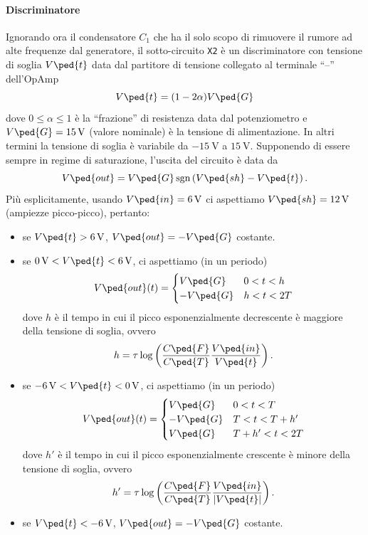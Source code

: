 \documentclass[10pt,a4paper]{article}
\begin{document}
\paragraph{Discriminatore}
Ignorando ora il condensatore $ C_{1} $ che ha il solo scopo di rimuovere il 
rumore ad alte frequenze dal generatore, il sotto-circuito \texttt{X2} è un 
discriminatore con tensione di soglia $ V\ped{t} $ data dal partitore di 
tensione collegato al terminale ``--'' dell'OpAmp
\[
  V\ped{t} = (1 - 2\alpha) V\ped{G}
\]
dove $ 0\leq \alpha \leq 1 $ è la ``frazione'' di resistenza data dal 
potenziometro e $ V\ped{G} = \SI{15}{\volt} $ (valore nominale) è la tensione 
di alimentazione. In altri termini la tensione di soglia è variabile da $ 
\SI{-15}{\volt} $ a $ \SI{15}{\volt} $. Supponendo di essere sempre in regime 
di saturazione, l'uscita del circuito è data da
\[
  V\ped{out} = V\ped{G} \sgn\left(V\ped{sh} - V\ped{t}\right).
\]
Più esplicitamente, usando $ V\ped{in} = \SI{6}{\volt} $ ci aspettiamo $ 
V\ped{sh} = \SI{12}{\volt} $ (ampiezze picco-picco), pertanto:
\begin{itemize}
\item se $ V\ped{t} > \SI{6}{\volt} $, $ V\ped{out} = -V\ped{G} $ costante.
\item se $ \SI{0}{\volt} < V\ped{t} < \SI{6}{\volt} $, ci aspettiamo (in un 
periodo)
  \[
    V\ped{out}(t) =
    \begin{cases}
      V\ped{G} & 0 < t < h \\
      - V\ped{G} & h < t < 2T
    \end{cases}
  \]
  dove $ h $ è il tempo in cui il picco esponenzialmente decrescente è 
maggiore della tensione di soglia, ovvero
  \begin{equation} \label{eq:tot-ampiezza-durata}
    h = \tau \log\left(\frac{C\ped{F}}{C\ped{T}} 
\frac{V\ped{in}}{V\ped{t}}\right).
  \end{equation}
\item se $ \SI{-6}{\volt} < V\ped{t} < \SI{0}{\volt} $, ci aspettiamo (in un 
periodo)
  \[
    V\ped{out}(t) =
    \begin{cases}
      V\ped{G} & 0 < t < T \\
      - V\ped{G} & T < t < T + h' \\
      V\ped{G} & T + h' < t < 2T
    \end{cases}
  \]
  dove $ h' $ è il tempo in cui il picco esponenzialmente crescente è minore 
della tensione di soglia, ovvero
  \[
    h' = \tau \log\left(\frac{C\ped{F}}{C\ped{T}} 
\frac{V\ped{in}}{\abs{V\ped{t}}}\right).
  \]
\item se $ V\ped{t} < \SI{-6}{\volt} $, $ V\ped{out} = -V\ped{G} $ costante.
\end{itemize}
\end{document}
